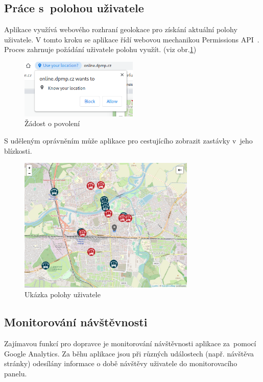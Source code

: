 \subsection{Práce s~polohou uživatele}
Aplikace využívá webového rozhraní geolokace pro získání aktuální polohy uživatele. V tomto kroku se aplikace řídí webovou mechanikou Permissions API~\cite{webpermissions}. Proces zahrnuje požádání uživatele polohu využít. (viz obr.\ref{geolokace})

\begin{figure}[H]
    \centering
    \includegraphics[width=0.5\textwidth]{images/geolocation_permission.png}
    \caption{Žádost o povolení}
    \label{geolokace}
\end{figure}

S uděleným oprávněním může aplikace pro cestujícího zobrazit zastávky v~jeho blízkosti.

\begin{figure}[H]
    \centering
    \includegraphics[width=0.75\textwidth]{images/position.png}
    \caption{Ukázka polohy uživatele}
    \label{poloha}
\end{figure}
\newpage
\subsection{Monitorování návštěvnosti}
Zajímavou funkcí pro dopravce je monitorování návštěvnosti aplikace za~pomocí Google Analytics. Za běhu aplikace jsou při různých událostech (např. návštěva stránky) odesílány informace o době návštěvy uživatele do monitorovacího panelu. \cite{googleanalytics}

